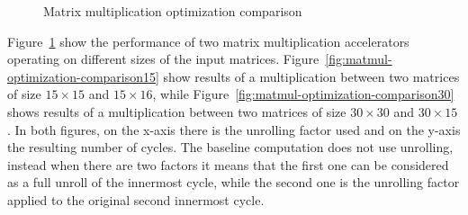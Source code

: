 \begin{figure}[t]
    \centering
    \hspace{0.15\textwidth}
    \caption{Matrix multiplication optimization comparison}
    \label{fig:matmul-optimization-comparison}
\end{figure}

Figure~\ref{fig:matmul-optimization-comparison} show the performance of two matrix multiplication accelerators operating on different sizes of the input matrices.
Figure~\ref{fig:matmul-optimization-comparison15} show results of a multiplication between two matrices of size $15\times15$ and $15\times16$, while Figure~\ref{fig:matmul-optimization-comparison30} shows results of a multiplication between two matrices of size $30\times30$ and $30\times15$.
In both figures, on the x-axis there is the unrolling factor used and on the y-axis the resulting number of cycles.
The baseline computation does not use unrolling, instead when there are two factors it means that the first one can be considered as a full unroll of the innermost cycle, while the second one is the unrolling factor applied to the original second innermost cycle.

